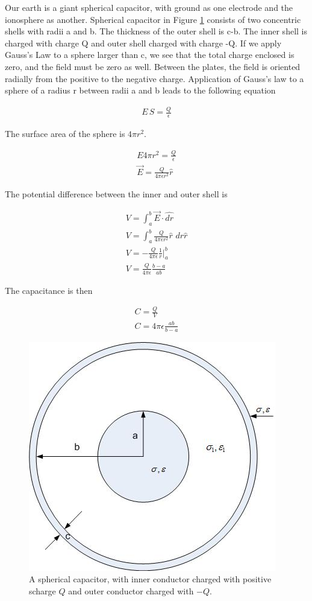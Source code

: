 \documentclass{ximera}
\begin{document}
Our earth is a giant spherical capacitor, with ground as one electrode and the ionosphere as another.  Spherical capacitor in Figure \ref{fig:sphericalCapacitor} consists of two concentric shells with radii a and b. The thickness of the outer shell is c-b.  The inner shell is charged with charge Q and outer shell charged with charge -Q. If we apply Gauss's Law to a sphere larger than c, we see that the total charge enclosed is zero, and the field must be zero as well. Between the plates, the field is oriented radially from the positive to the negative charge. Application of Gauss's law to a sphere of a radius r between radii a and b leads to the following equation

\begin{eqnarray}
E\,S = \frac{Q}{\epsilon}
\end{eqnarray}

The surface area of the sphere is $4 \pi r^2$.


\begin{eqnarray}
E 4 \pi r^2 = \frac{Q}{\epsilon} \\
\vec{E}=\frac{Q}{4 \pi \epsilon r^2} \hat{r}
\end{eqnarray}

The potential difference between the inner and outer shell is


\begin{eqnarray}
V=\int_a^b  \vec{E} \cdot  \hat{dr} \\
V=\int_a^b \frac{Q}{4 \pi \epsilon r^2} \hat{r} \,\, dr \hat{r} \\
V=-\frac{Q}{4 \pi \epsilon} \frac{1}{r}|_a^b \\
V=\frac{Q}{4 \pi \epsilon} \frac{b-a}{ab}
\end{eqnarray}

The capacitance is then


\begin{eqnarray}
C=\frac{Q}{V} \\
C=4 \pi \epsilon \frac{ab}{b-a}
\end{eqnarray}

\begin{figure}[htbp]
\begin{center}
\includegraphics[scale=1]{../jpg/sphereandcylcc.jpg}
\end{center}
\caption{A spherical capacitor, with inner conductor charged with positive scharge $Q$ and outer conductor charged with $-Q.$}
\label{fig:sphericalCapacitor}
\end{figure}
\end{document}
